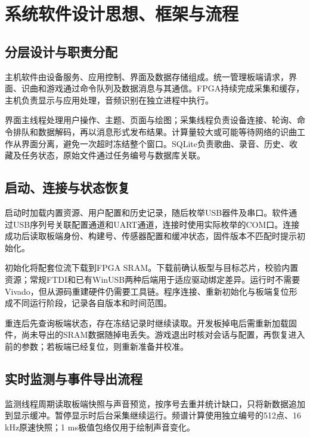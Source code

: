 \chapter{系统软件设计思想、框架与流程}
\section{分层设计与职责分配}
主机软件由设备服务、应用控制、界面及数据存储组成。统一管理板端请求，界面、识曲和游戏通过命令队列及数据消息与其通信。FPGA持续完成采集和缓存，主机负责显示与应用处理，音频识别在独立进程中执行。


界面主线程处理用户操作、主题、页面与绘图；采集线程负责设备连接、轮询、命令排队和数据解码，再以消息形式发布结果。计算量较大或可能等待网络的识曲工作从界面分离，避免一次超时冻结整个窗口。SQLite负责歌曲、录音、历史、收藏及任务状态，原始文件通过任务编号与数据库关联。

\section{启动、连接与状态恢复}
启动时加载内置资源、用户配置和历史记录，随后枚举USB器件及串口。软件通过USB序列号关联配置通道和UART通道，连接时使用实际枚举的COM口。连接成功后读取板端身份、构建号、传感器配置和缓冲状态，固件版本不匹配时提示初始化。

初始化将配套位流下载到FPGA SRAM。下载前确认板型与目标芯片，校验内置资源；常规FTDI和已有WinUSB两种后端用于适应驱动绑定差异。运行时不需要Vivado，但从源码重建硬件仍需要工具链。程序连接、重新初始化与板端复位形成不同运行阶段，记录各自版本和时间范围。

重连后先查询板端状态，存在冻结记录时继续读取。开发板掉电后需重新加载固件，尚未导出的SRAM数据随掉电丢失。游戏退出时核对会话与配置，再恢复进入前的参数；若板端已经复位，则重新准备并校准。

\section{实时监测与事件导出流程}
监测线程周期读取板端快照与声音预览，按序号去重并统计缺口，只将新数据追加到显示缓冲。暂停显示时后台采集继续运行。频谱计算使用独立编号的512点、16 kHz原速快照；1 ms极值包络仅用于绘制声音变化。


